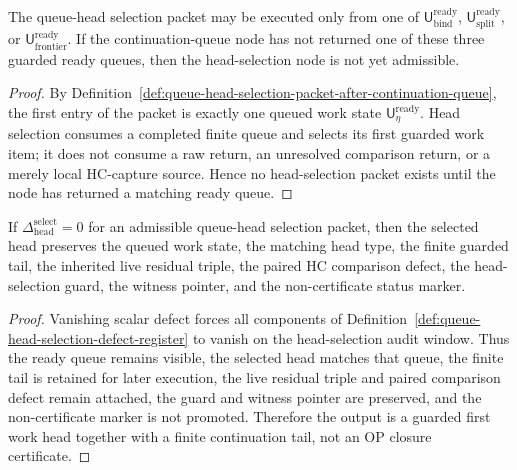 \begin{lemma}
\label{lem:continuation-queue-output-is-head-selection-precondition}
The queue-head selection packet may be executed only from one of \(\mathsf U_{\mathrm{bind}}^{\mathrm{ready}}\), \(\mathsf U_{\mathrm{split}}^{\mathrm{ready}}\), or \(\mathsf U_{\mathrm{frontier}}^{\mathrm{ready}}\). If the continuation-queue node has not returned one of these three guarded ready queues, then the head-selection node is not yet admissible.
\end{lemma}

\begin{proof}
By Definition~\ref{def:queue-head-selection-packet-after-continuation-queue}, the first entry of the packet is exactly one queued work state \(\mathsf U_{\eta}^{\mathrm{ready}}\). Head selection consumes a completed finite queue and selects its first guarded work item; it does not consume a raw return, an unresolved comparison return, or a merely local HC-capture source. Hence no head-selection packet exists until the node has returned a matching ready queue.
\end{proof}

\begin{lemma}
\label{lem:zero-queue-head-selection-defect-preserves-selected-head-data}
If \(\Delta_{\mathrm{head}}^{\mathrm{select}}=0\) for an admissible queue-head selection packet, then the selected head preserves the queued work state, the matching head type, the finite guarded tail, the inherited live residual triple, the paired HC comparison defect, the head-selection guard, the witness pointer, and the non-certificate status marker.
\end{lemma}

\begin{proof}
Vanishing scalar defect forces all components of Definition~\ref{def:queue-head-selection-defect-register} to vanish on the head-selection audit window. Thus the ready queue remains visible, the selected head matches that queue, the finite tail is retained for later execution, the live residual triple and paired comparison defect remain attached, the guard and witness pointer are preserved, and the non-certificate marker is not promoted. Therefore the output is a guarded first work head together with a finite continuation tail, not an OP closure certificate.
\end{proof}

